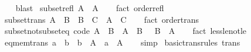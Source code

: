 \begin{isabellebody}
%
\isadelimproof
\ \ %
\endisadelimproof
%
\isatagproof
{}\isamarkupfalse%
\ blast%
\endisatagproof
{\isafoldproof}%
%
\isadelimproof
\isanewline
%
\endisadelimproof
\isanewline
{}\isamarkupfalse%
\ subset{\isacharunderscore}{\kern0pt}refl{\isacharcolon}{\kern0pt}\ {\isachardoublequoteopen}A\ {\isasymsubseteq}\ A{\isachardoublequoteclose}\isanewline
%
\isadelimproof
\ \ %
\endisadelimproof
%
\isatagproof
{}\isamarkupfalse%
\ {\isacharparenleft}{\kern0pt}fact\ order{\isacharunderscore}{\kern0pt}refl{\isacharparenright}{\kern0pt}%
\endisatagproof
{\isafoldproof}%
%
\isadelimproof
%
\endisadelimproof
\ \isanewline
\isanewline
{}\isamarkupfalse%
\ subset{\isacharunderscore}{\kern0pt}trans{\isacharcolon}{\kern0pt}\ {\isachardoublequoteopen}A\ {\isasymsubseteq}\ B\ {\isasymLongrightarrow}\ B\ {\isasymsubseteq}\ C\ {\isasymLongrightarrow}\ A\ {\isasymsubseteq}\ C{\isachardoublequoteclose}\isanewline
%
\isadelimproof
\ \ %
\endisadelimproof
%
\isatagproof
{}\isamarkupfalse%
\ {\isacharparenleft}{\kern0pt}fact\ order{\isacharunderscore}{\kern0pt}trans{\isacharparenright}{\kern0pt}%
\endisatagproof
{\isafoldproof}%
%
\isadelimproof
\isanewline
%
\endisadelimproof
\isanewline
{}\isamarkupfalse%
\ subset{\isacharunderscore}{\kern0pt}not{\isacharunderscore}{\kern0pt}subset{\isacharunderscore}{\kern0pt}eq\ {\isacharbrackleft}{\kern0pt}code{\isacharbrackright}{\kern0pt}{\isacharcolon}{\kern0pt}\ {\isachardoublequoteopen}A\ {\isasymsubset}\ B\ {\isasymlongleftrightarrow}\ A\ {\isasymsubseteq}\ B\ {\isasymand}\ {\isasymnot}\ B\ {\isasymsubseteq}\ A{\isachardoublequoteclose}\isanewline
%
\isadelimproof
\ \ %
\endisadelimproof
%
\isatagproof
{}\isamarkupfalse%
\ {\isacharparenleft}{\kern0pt}fact\ less{\isacharunderscore}{\kern0pt}le{\isacharunderscore}{\kern0pt}not{\isacharunderscore}{\kern0pt}le{\isacharparenright}{\kern0pt}%
\endisatagproof
{\isafoldproof}%
%
\isadelimproof
\isanewline
%
\endisadelimproof
\isanewline
{}\isamarkupfalse%
\ eq{\isacharunderscore}{\kern0pt}mem{\isacharunderscore}{\kern0pt}trans{\isacharcolon}{\kern0pt}\ {\isachardoublequoteopen}a\ {\isacharequal}{\kern0pt}\ b\ {\isasymLongrightarrow}\ b\ {\isasymin}\ A\ {\isasymLongrightarrow}\ a\ {\isasymin}\ A{\isachardoublequoteclose}\isanewline
%
\isadelimproof
\ \ %
\endisadelimproof
%
\isatagproof
{}\isamarkupfalse%
\ simp%
\endisatagproof
{\isafoldproof}%
%
\isadelimproof
\isanewline
%
\endisadelimproof
\isanewline
{}\isamarkupfalse%
\ basic{\isacharunderscore}{\kern0pt}trans{\isacharunderscore}{\kern0pt}rules\ {\isacharbrackleft}{\kern0pt}trans{\isacharbrackright}{\kern0pt}\ {\isacharequal}{\kern0pt}\isanewline

\end{isabellebody}
